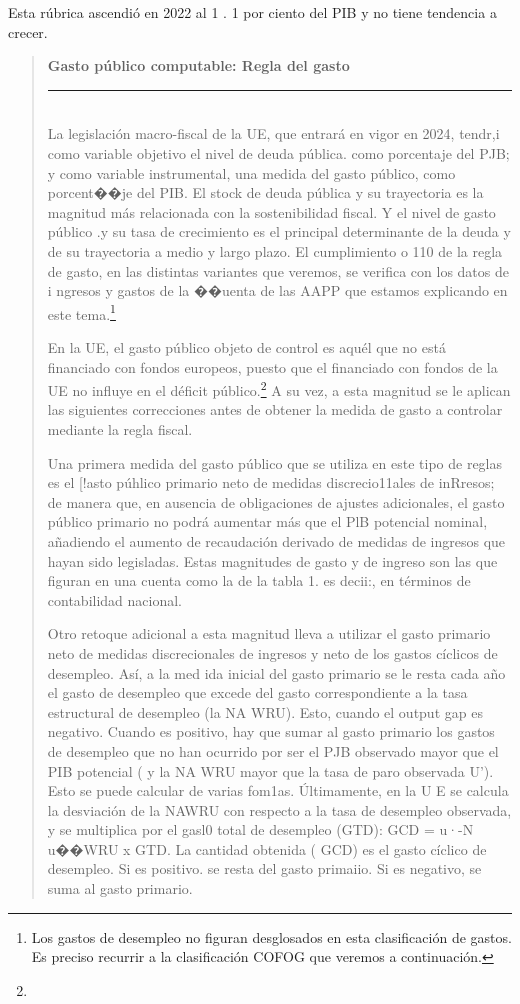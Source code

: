 \documentclass[10pt,a4paper]{article}
\newenvironment{specialblock}[1]{%
      \begin{quote} %
      \small %
      \noindent\textbf{#1}\\[-0.3em] %
      \rule{\linewidth}{0.4pt}\\[0.6em]}{
      \end{quote}}
\begin{document}
Esta rúbrica ascendió en 2022 al 1 . 1 por ciento del PIB y no tiene tendencia a crecer.

\begin{specialblock}{\textbf{Gasto público computable:} Regla del gasto}
    La legislación macro-fiscal de la UE, que entrará en vigor en 2024, tendr,i como variable objetivo el nivel de deuda pública. como porcentaje del PJB; y como variable instrumental, una medida del gasto público, como porcent��je del PIB. El stock de deuda pública y su trayectoria es la magnitud más relacionada con la sostenibilidad fiscal. Y el nivel de gasto público .y su tasa de crecimiento es el principal determinante de la deuda y de su trayectoria a medio y largo plazo. El cumplimiento o 110 de la regla de gasto, en las distintas variantes que veremos, se verifica con los datos de i ngresos y gastos de la ��uenta de las AAPP que estamos explicando en este tema.\footnote{%
        Los gastos de desempleo no figuran desglosados en esta clasificación de gastos. Es preciso recurrir a la clasificación COFOG que veremos a continuación.
    }
    
    En la UE, el gasto público objeto de control es aquél que no está financiado con fondos europeos, puesto que el financiado con fondos de la UE no influye en el déficit público.\footnote{
    
    } A su vez, a esta magnitud se le aplican las siguientes correcciones antes de obtener la medida de gasto a controlar mediante la regla fiscal.
    
    Una primera medida del gasto público que se utiliza en este tipo de reglas es el [!asto púhlico primario neto de medidas discrecio11ales de inRresos; de manera que, en ausencia de obligaciones de ajustes adicionales, el gasto público primario no podrá aumentar más que el PlB potencial nominal, añadiendo el aumento de recaudación derivado de medidas de ingresos que hayan sido legisladas. Estas magnitudes de gasto y de ingreso son las que figuran en una cuenta como la de la tabla 1. es decii:, en términos de contabilidad nacional. 

    Otro retoque adicional a esta magnitud lleva a utilizar el gasto primario neto de medidas discrecionales de ingresos y neto de los gastos cíclicos de desempleo. Así, a la med ida inicial del gasto primario se le resta cada año el gasto de desempleo que excede del gasto correspondiente a la tasa estructural de desempleo (la NA WRU). Esto, cuando el output gap es negativo. Cuando es positivo, hay que sumar al gasto primario los gastos de desempleo que no han ocurrido por ser el PJB observado mayor que el PIB potencial ( y la NA WRU mayor que la tasa de paro observada U'). Esto se puede calcular de varias fom1as. Últimamente, en la U E se calcula la desviación de la NAWRU con respecto a la tasa de desempleo observada, y se multiplica por el gasl0 total de desempleo (GTD): GCD = u·-N u��WRU x GTD. La cantidad obtenida ( GCD) es el gasto cíclico de desempleo. Si es positivo. se resta del gasto primaiio. Si es negativo, se suma al gasto primario.


\end{specialblock}
\end{document}
